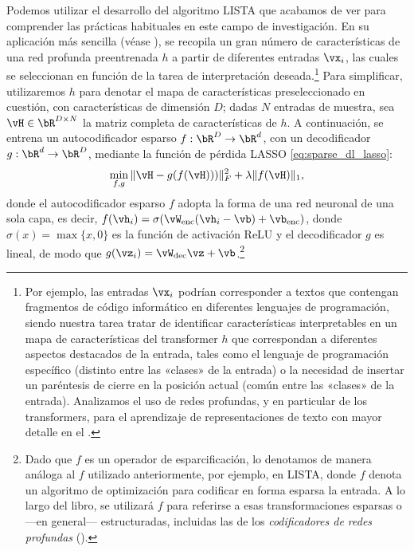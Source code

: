 \documentclass[../../book-main.tex]{subfiles}
\begin{document}
Podemos utilizar el desarrollo del algoritmo LISTA que acabamos de ver 
para comprender las prácticas habituales en este campo de investigación.
En su aplicación más sencilla (véase \citep{huben2024sparse,
gao2025scaling}), se recopila un gran número de características de una 
red profunda preentrenada $h$ a partir de diferentes entradas $\vx_i$, 
las cuales se seleccionan en función de la tarea de interpretación deseada.\footnote{Por ejemplo, 
    las entradas $\vx_i$ podrían corresponder a textos que contengan fragmentos de código informático en
    diferentes lenguajes de programación, siendo nuestra tarea tratar de identificar
    características interpretables en
    un mapa de características del transformer $h$ que correspondan a diferentes
    aspectos destacados de la entrada, tales como el lenguaje de programación específico (distinto entre las
    «clases» de la entrada) o la necesidad de insertar un paréntesis de cierre en la posición actual
    (común entre las «clases» de la entrada). Analizamos el
    uso de redes profundas, y en particular de los transformers, para el aprendizaje de representaciones de texto
con mayor detalle en el .} Para simplificar, utilizaremos $h$ para denotar el mapa de 
características preseleccionado en cuestión, con características de dimensión $D$; dadas $N$ entradas de 
muestra, sea $\vH \in \bR^{D \times N}$ la matriz completa de características de $h$.
A continuación, se entrena un autocodificador esparso $f : \bR^D \to \bR^d$, con
un decodificador $g : \bR^d \to \bR^D$, mediante la función de pérdida 
LASSO \eqref{eq:sparse_dl_lasso}:
\begin{equation}\label{eq:sae-loss}
    \min_{f, g} \| \vH - g(f(\vH))) \|_F^2 + \lambda \|f(\vH)\|_1 ,
\end{equation}
donde el autocodificador esparso $f$ adopta la forma de una red neuronal de una sola capa,
es decir, $f(\vh_i) = \sigma(\vW_{\mathrm{enc}}(\vh_i - \vb)
+ \vb_{\mathrm{enc}})$, donde $\sigma(x) = \max \{x, 0\}$ es la función de activación ReLU
y el decodificador $g$ es lineal, de modo que $g(\vz_i)
= \vW_{\mathrm{dec}}\vz + \vb$.\footnote{Dado que \(f\) es un operador de
    esparcificación, lo denotamos de manera análoga al \(f\) utilizado anteriormente, por ejemplo,
    en LISTA, donde \(f\) denota un algoritmo de optimización para codificar en forma
    esparsa la entrada. A lo largo del libro, se utilizará \(f\) para referirse a
    esas transformaciones esparsas o ---en general--- estructuradas, incluidas las
    de los \textit{codificadores de redes profundas}
().}
\end{document}
